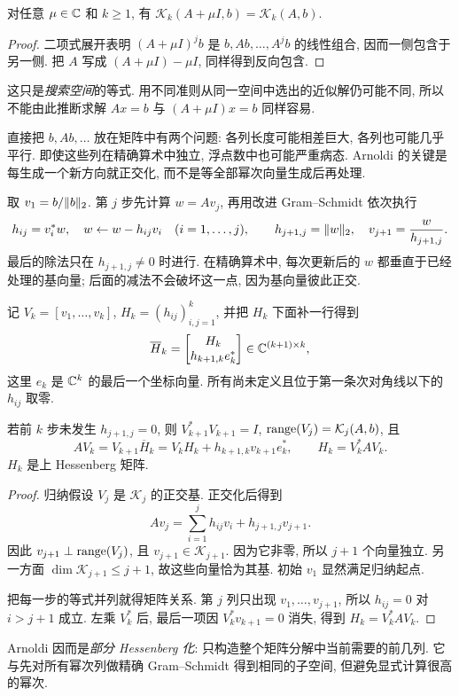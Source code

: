 \begin{proposition}\label{prop:krylov-shift}
对任意 $\mu\in\mathbb C$ 和 $k\ge1$, 有
$\mathcal K_k(A+\mu I,b)=\mathcal K_k(A,b)$.
\end{proposition}
\begin{proof}
二项式展开表明 $(A+\mu I)^jb$ 是 $b,Ab,\ldots,A^jb$ 的线性组合, 因而一侧包含于另一侧. 把 $A$ 写成 $(A+\mu I)-\mu I$, 同样得到反向包含.
\end{proof}
这只是\emph{搜索空间}的等式. 用不同准则从同一空间中选出的近似解仍可能不同, 所以不能由此推断求解 $Ax=b$ 与 $(A+\mu I)x=b$ 同样容易.

直接把 $b,Ab,\ldots$ 放在矩阵中有两个问题: 各列长度可能相差巨大, 各列也可能几乎平行. 即使这些列在精确算术中独立, 浮点数中也可能严重病态. Arnoldi 的关键是每生成一个新方向就正交化, 而不是等全部幂次向量生成后再处理.

取 $v_1=b/\lVert b\rVert_2$. 第 $j$ 步先计算 $w=Av_j$, 再用改进 Gram--Schmidt 依次执行
\begin{equation}\label{eq:arnoldi-step}
 h_{ij}=v_i^*w,\quad w\leftarrow w-h_{ij}v_i\quad(i=1,\ldots,j),\qquad
 h_{j+1,j}=\lVert w\rVert_2,\quad v_{j+1}=\frac{w}{h_{j+1,j}}.
\end{equation}
最后的除法只在 $h_{j+1,j}\ne0$ 时进行. 在精确算术中, 每次更新后的 $w$ 都垂直于已经处理的基向量; 后面的减法不会破坏这一点, 因为基向量彼此正交.

记 $V_k=[v_1,\ldots,v_k]$, $H_k=(h_{ij})_{i,j=1}^k$, 并把 $H_k$ 下面补一行得到
\[
\overline H_k=
\begin{bmatrix}H_k\\ h_{k+1,k}e_k^*\end{bmatrix}\in\mathbb C^{(k+1)\times k},
\]
这里 $e_k$ 是 $\mathbb C^k$ 的最后一个坐标向量. 所有尚未定义且位于第一条次对角线以下的 $h_{ij}$ 取零.

\begin{theorem}[Arnoldi 关系]\label{thm:arnoldi}
若前 $k$ 步未发生 $h_{j+1,j}=0$, 则 $V_{k+1}^*V_{k+1}=I$, $\operatorname{range}(V_j)=\mathcal K_j(A,b)$, 且
\begin{equation}\label{eq:arnoldi-relation}
 AV_k=V_{k+1}\overline H_k
 =V_kH_k+h_{k+1,k}v_{k+1}e_k^*,\qquad H_k=V_k^*AV_k.
\end{equation}
$H_k$ 是上 Hessenberg 矩阵.
\end{theorem}
\begin{proof}
归纳假设 $V_j$ 是 $\mathcal K_j$ 的正交基. 正交化后得到
\[
Av_j=\sum_{i=1}^{j}h_{ij}v_i+h_{j+1,j}v_{j+1}.
\]
因此 $v_{j+1}\perp\operatorname{range}(V_j)$, 且 $v_{j+1}\in\mathcal K_{j+1}$. 因为它非零, 所以 $j+1$ 个向量独立. 另一方面 $\dim\mathcal K_{j+1}\le j+1$, 故这些向量恰为其基. 初始 $v_1$ 显然满足归纳起点.

把每一步的等式并列就得矩阵关系. 第 $j$ 列只出现 $v_1,\ldots,v_{j+1}$, 所以 $h_{ij}=0$ 对 $i>j+1$ 成立. 左乘 $V_k^*$ 后, 最后一项因 $V_k^*v_{k+1}=0$ 消失, 得到 $H_k=V_k^*AV_k$.
\end{proof}
Arnoldi 因而是\emph{部分 Hessenberg 化}: 只构造整个矩阵分解中当前需要的前几列. 它与先对所有幂次列做精确 Gram--Schmidt 得到相同的子空间, 但避免显式计算很高的幂次.

